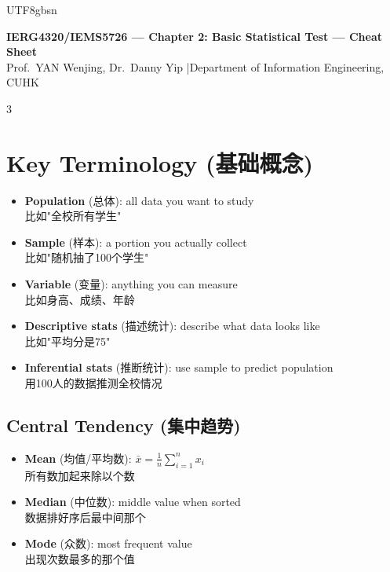 \documentclass[10pt,landscape,a4paper]{article}
\newcommand{\zhint}[1]{{\scriptsize\color{gray!70!black}#1}}
\begin{document}
\begin{CJK}{UTF8}{gbsn}

\begin{center}
    {\large\bfseries IERG4320/IEMS5726 --- Chapter 2: Basic Statistical Test --- Cheat Sheet}\\[2pt]
    {\small Prof.\ YAN Wenjing, Dr.\ Danny Yip \quad|\quad Department of Information Engineering, CUHK}
\end{center}

\vspace{2pt}
\begin{multicols}{3}

\section{Key Terminology \zhint{(基础概念)}}

\begin{itemize}[leftmargin=*, nosep, itemsep=1pt]
    \item \textbf{Population} \zhint{(总体)}: all data you want to study\\
    \zhint{比如"全校所有学生"}
    \item \textbf{Sample} \zhint{(样本)}: a portion you actually collect\\
    \zhint{比如"随机抽了100个学生"}
    \item \textbf{Variable} \zhint{(变量)}: anything you can measure\\
    \zhint{比如身高、成绩、年龄}
    \item \textbf{Descriptive stats} \zhint{(描述统计)}: describe what data looks like\\
    \zhint{比如"平均分是75"}
    \item \textbf{Inferential stats} \zhint{(推断统计)}: use sample to predict population\\
    \zhint{用100人的数据推测全校情况}
\end{itemize}

\subsection{Central Tendency \zhint{(集中趋势)}}
\begin{itemize}[leftmargin=*, nosep, itemsep=1pt]
    \item \textbf{Mean} \zhint{(均值/平均数)}: $\bar{x} = \frac{1}{n}\sum_{i=1}^{n} x_i$\\
    \zhint{所有数加起来除以个数}
    \item \textbf{Median} \zhint{(中位数)}: middle value when sorted\\
    \zhint{数据排好序后最中间那个}
    \item \textbf{Mode} \zhint{(众数)}: most frequent value\\
    \zhint{出现次数最多的那个值}
\end{itemize}


\end{multicols}
\end{CJK}
\end{document}
